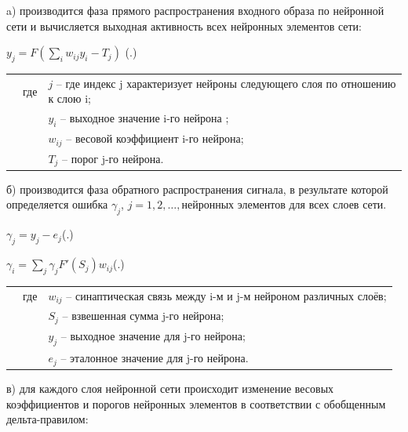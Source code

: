 	\par \redline a) производится фаза прямого распространения входного образа по нейронной сети и вычисляется выходная активность всех нейронных элементов сети:
	
		\formulaspace \par \redline 
	$y_{j} = F(\sum \limits _{i}^{} w_{ij}y_{i} - T_{j}) $
	\hfill (\thechaptercntr .\theformulacntr) \redline
	\formulaspace \addtocounter{formulacntr}{1}
	
	\begin{tabular}{p{}p{}p{}}
		& где  & $j$ {--} где индекс j характеризует нейроны следующего слоя по отношению к
		слою i; \\
		&      & $y_{i}$ {--} выходное значение i-го нейрона ; \\
		&      & $w_{ij}$ {--} весовой коэффициент i-го нейрона; \\
		&      & $T_{j}$ {--} порог j-го нейрона. \\
	\end{tabular}
	
	\par \redline б) производится фаза обратного распространения сигнала, в результате которой определяется ошибка $\gamma_{j}$, $j=1,2,\dots, $нейронных элементов
	для всех слоев сети. 
	
	\formulaspace \par \redline 
	$\gamma_{j} = y_{j} - e_{j} $\hfill (\thechaptercntr .\theformulacntr) \redline
	\formulaspace \addtocounter{formulacntr}{1}
	
	\formulaspace \par \redline 
	$\gamma_{i} =  \sum \limits _{j}^{} \gamma_{j} F'(S_{j}) w_{ij}$\hfill (\thechaptercntr .\theformulacntr) \redline
	\formulaspace \addtocounter{formulacntr}{1}
	
	\begin{tabular}{p{}p{}p{}}
		& где  & $w_{ij}$ {--} синаптическая связь между i-м и j-м нейроном различных слоёв; \\
		&      & $S_{j}$ {--} взвешенная сумма j-го нейрона; \\
		&      & $y_{j}$ {--} выходное значение для j-го нейрона; \\
		&      & $e_{j}$ {--} эталонное значение для j-го нейрона. \\
	\end{tabular}

	\par \redline в) для каждого слоя нейронной сети происходит изменение весовых коэффициентов и порогов нейронных элементов в соответствии с обобщенным дельта-правилом:

